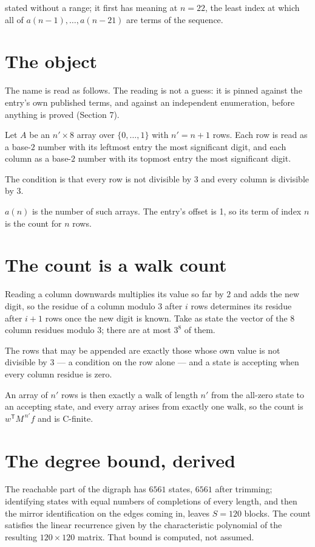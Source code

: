 \documentclass[11pt]{article}
\theoremstyle{definition}
\begin{document}
stated without a range; it first has meaning at $n = 22$, the least index at which all of $a(n-1),\dots,a(n-21)$ are terms of the sequence.

\section{The object}

The name is read as follows. The reading is not a guess: it is pinned against the entry's own published terms, and against an independent enumeration, before anything is proved (Section 7).

Let $A$ be an $n' \times 8$ array over $\{0,\dots,1\}$ with $n' = n + 1$ rows. Each row is read as a base-$2$ number with its leftmost entry the most significant digit, and each column as a base-$2$ number with its topmost entry the most significant digit.

The condition is that every row is not divisible by $3$ and every column is divisible by $3$.

$a(n)$ is the number of such arrays. The entry's offset is 1, so its term of index $n$ is the count for $n$ rows.

\section{The count is a walk count}

Reading a column downwards multiplies its value so far by $2$ and adds the new digit, so the residue of a column modulo $3$ after $i$ rows determines its residue after $i+1$ rows once the new digit is known. Take as state the vector of the $8$ column residues modulo $3$; there are at most $3^{8}$ of them.

The rows that may be appended are exactly those whose own value is not divisible by $3$ --- a condition on the row alone --- and a state is accepting when every column residue is zero.

An array of $n'$ rows is then exactly a walk of length $n'$ from the all-zero state to an accepting state, and every array arises from exactly one walk, so the count is $w^{\mathsf T}M^{\,n'}f$ and is C-finite.

\section{The degree bound, derived}

The reachable part of the digraph has $6561$ states, $6561$ after trimming; identifying states with equal numbers of completions of every length, and then the mirror identification on the edges coming in, leaves $S = 120$ blocks. The count satisfies the linear recurrence given by the characteristic polynomial of the resulting $120\times120$ matrix. That bound is computed, not assumed.
\end{document}
